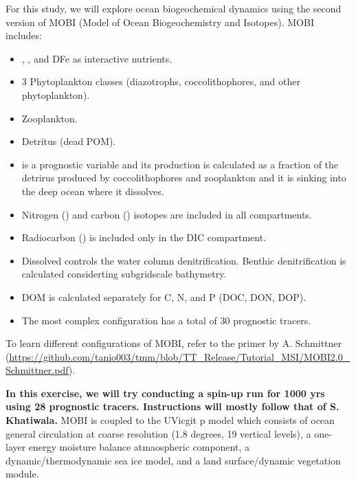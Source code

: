\documentclass[a4paper]{article}
\def\noin{\noindent }
\begin{document}
For this study, we will explore ocean biogeochemical dynamics using the second version of MOBI (Model of Ocean Biogeochemistry and Isotopes). MOBI includes:
\begin{itemize}
\item {}, , and DFe as interactive nutrients.
\item 3 Phytoplankton classes (diazotrophs, coccolithophores, and other phytoplankton).
\item Zooplankton.
\item Detritus (dead POM).
\item {} is a prognostic variable and its production is calculated as a fraction of the detrirus produced by coccolithophores and zooplankton and it is sinking into the deep ocean where it dissolves.
\item Nitrogen () and carbon () isotopes are included in all compartments.
\item Radiocarbon () is included only in the DIC compartment.
\item Dissolved  controls the water column denitrification. Benthic denitrification is calculated considerting subgridscale bathymetry.
\item DOM is calculated separately for C, N, and P (DOC, DON, DOP).
\item The most complex configuration has a total of 30 prognostic tracers.
\end{itemize}
\noin To learn different configurations of MOBI, refer to the primer by A. Schmittner (\url{https://github.com/tanio003/tmm/blob/TT_Release/Tutorial_MSI/MOBI2.0_Schmittner.pdf}). 

\textbf{In this exercise, we will try conducting a spin-up run for 1000 yrs using 28 prognostic tracers. Instructions will mostly follow that of S. Khatiwala.} MOBI is coupled to the UVicgit p model which consists of ocean general circulation at coarse resolution (1.8 degrees, 19 vertical levels), a one-layer energy moisture balance atmaospheric component, a dynamic/thermodynamic sea ice model, and a land surface/dynamic vegetation module. 
\end{document}
